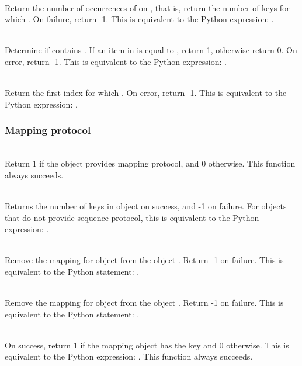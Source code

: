      \\
         Return the number of occurrences of  on , that is,
	 return the number of keys for which .  On
	 failure, return -1.  This is equivalent to the Python
	 expression: .

     \\
	 Determine if  contains .  If an item in  is equal to
	 , return 1, otherwise return 0.  On error, return -1.  This
	 is equivalent to the Python expression: .

     \\
	 Return the first index for which .  On error,
	 return -1.    This is equivalent to the Python
	 expression: .

\subsubsection{Mapping protocol}

     \\
         Return 1 if the object provides mapping protocol, and 0
	 otherwise.  
	 This function always succeeds.


     \\
         Returns the number of keys in object  on success, and -1 on
	 failure.  For objects that do not provide sequence protocol,
	 this is equivalent to the Python expression: .


     \\
	 Remove the mapping for object  from the object .
	 Return -1 on failure.  This is equivalent to
	 the Python statement: .


     \\
	 Remove the mapping for object  from the object .
	 Return -1 on failure.  This is equivalent to
	 the Python statement: .


     \\
	 On success, return 1 if the mapping object has the key 
	 and 0 otherwise.  This is equivalent to the Python expression:
	 . 
	 This function always succeeds.


